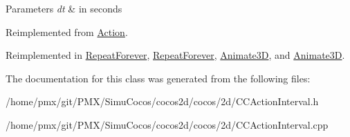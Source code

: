 \begin{DoxyParams}{Parameters}
{\em dt} & in seconds \\
\hline
\end{DoxyParams}


Reimplemented from \hyperlink{classAction_a9a64ee9e8e977672748f70893ebaff66}{Action}.



Reimplemented in \hyperlink{classRepeatForever_a102815f01bc0afc0fbcb31840cdb699b}{Repeat\+Forever}, \hyperlink{classRepeatForever_ab54150411685995a17a2b68d561e8d9c}{Repeat\+Forever}, \hyperlink{classAnimate3D_a9fed05e5478085f002769b6931a123d4}{Animate3D}, and \hyperlink{classAnimate3D_a0bd0e3f67af5be334ef07255a711c476}{Animate3D}.



The documentation for this class was generated from the following files\+:\begin{DoxyCompactItemize}
\item 
/home/pmx/git/\+P\+M\+X/\+Simu\+Cocos/cocos2d/cocos/2d/C\+C\+Action\+Interval.\+h\item 
/home/pmx/git/\+P\+M\+X/\+Simu\+Cocos/cocos2d/cocos/2d/C\+C\+Action\+Interval.\+cpp\end{DoxyCompactItemize}
